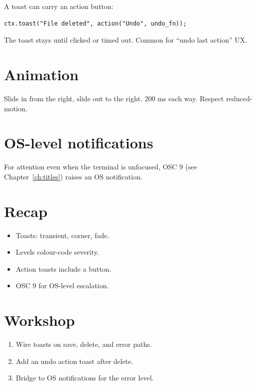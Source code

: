 A toast can carry an action button:

\begin{lstlisting}
ctx.toast("File deleted", action("Undo", undo_fn));
\end{lstlisting}

The toast stays until clicked or timed out. Common for
``undo last action'' UX.

\section{Animation}

Slide in from the right, slide out to the right. 200 ms
each way. Respect reduced-motion.

\section{OS-level notifications}

For attention even when the terminal is unfocused, OSC 9
(see Chapter~\ref{ch:titles}) raises an OS notification.

\section{Recap}

\begin{recap}
\begin{itemize}[leftmargin=*]
  \item Toasts: transient, corner, fade.
  \item Levels colour-code severity.
  \item Action toasts include a button.
  \item OSC 9 for OS-level escalation.
\end{itemize}
\end{recap}

\section*{Workshop}

\begin{enumerate}[leftmargin=*]
  \item Wire toasts on save, delete, and error paths.
  \item Add an undo action toast after delete.
  \item Bridge to OS notifications for the error level.
\end{enumerate}
